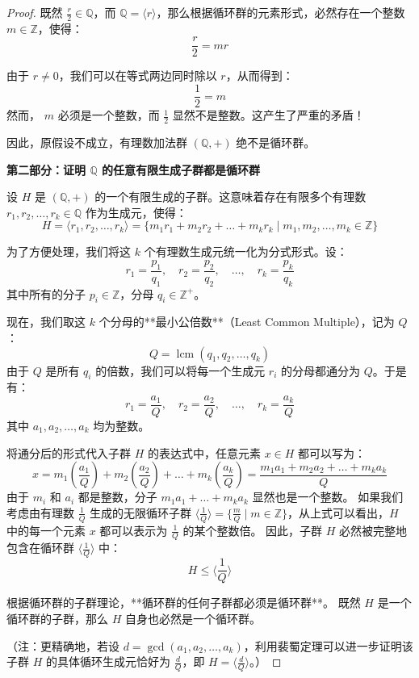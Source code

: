 \documentclass[]{article}
\begin{document}
\begin{proof}
既然 $\frac{r}{2} \in \mathbb{Q}$，而 $\mathbb{Q} = \langle r \rangle$，那么根据循环群的元素形式，必然存在一个整数 $m \in \mathbb{Z}$，使得：
\[ \frac{r}{2} = mr \]

由于 $r \neq 0$，我们可以在等式两边同时除以 $r$，从而得到：
\[ \frac{1}{2} = m \]
然而， $m$ 必须是一个整数，而 $\frac{1}{2}$ 显然不是整数。这产生了严重的矛盾！

因此，原假设不成立，有理数加法群 $(\mathbb{Q}, +)$ 绝不是循环群。

\bigskip
\noindent \textbf{第二部分：证明 $\mathbb{Q}$ 的任意有限生成子群都是循环群}

设 $H$ 是 $(\mathbb{Q}, +)$ 的一个有限生成的子群。这意味着存在有限多个有理数 $r_1, r_2, \dots, r_k \in \mathbb{Q}$ 作为生成元，使得：
\[ H = \langle r_1, r_2, \dots, r_k \rangle = \{ m_1 r_1 + m_2 r_2 + \dots + m_k r_k \mid m_1, m_2, \dots, m_k \in \mathbb{Z} \} \]

为了方便处理，我们将这 $k$ 个有理数生成元统一化为分式形式。设：
\[ r_1 = \frac{p_1}{q_1}, \quad r_2 = \frac{p_2}{q_2}, \quad \dots, \quad r_k = \frac{p_k}{q_k} \]
其中所有的分子 $p_i \in \mathbb{Z}$，分母 $q_i \in \mathbb{Z}^+$。

现在，我们取这 $k$ 个分母的**最小公倍数**（Least Common Multiple），记为 $Q$：
\[ Q = \operatorname{lcm}(q_1, q_2, \dots, q_k) \]
由于 $Q$ 是所有 $q_i$ 的倍数，我们可以将每一个生成元 $r_i$ 的分母都通分为 $Q$。于是有：
\[ r_1 = \frac{a_1}{Q}, \quad r_2 = \frac{a_2}{Q}, \quad \dots, \quad r_k = \frac{a_k}{Q} \]
其中 $a_1, a_2, \dots, a_k$ 均为整数。

将通分后的形式代入子群 $H$ 的表达式中，任意元素 $x \in H$ 都可以写为：
\[ x = m_1 \left(\frac{a_1}{Q}\right) + m_2 \left(\frac{a_2}{Q}\right) + \dots + m_k \left(\frac{a_k}{Q}\right) = \frac{m_1 a_1 + m_2 a_2 + \dots + m_k a_k}{Q} \]
由于 $m_i$ 和 $a_i$ 都是整数，分子 $m_1 a_1 + \dots + m_k a_k$ 显然也是一个整数。
如果我们考虑由有理数 $\frac{1}{Q}$ 生成的无限循环子群 $\langle \frac{1}{Q} \rangle = \{ \frac{m}{Q} \mid m \in \mathbb{Z} \}$，从上式可以看出，$H$ 中的每一个元素 $x$ 都可以表示为 $\frac{1}{Q}$ 的某个整数倍。
因此，子群 $H$ 必然被完整地包含在循环群 $\langle \frac{1}{Q} \rangle$ 中：
\[ H \leqslant \langle \frac{1}{Q} \rangle \]

根据循环群的子群理论，**循环群的任何子群都必须是循环群**。
既然 $H$ 是一个循环群的子群，那么 $H$ 自身也必然是一个循环群。

（注：更精确地，若设 $d = \gcd(a_1, a_2, \dots, a_k)$，利用裴蜀定理可以进一步证明该子群 $H$ 的具体循环生成元恰好为 $\frac{d}{Q}$，即 $H = \langle \frac{d}{Q} \rangle$。）


\end{proof}
\end{document}
